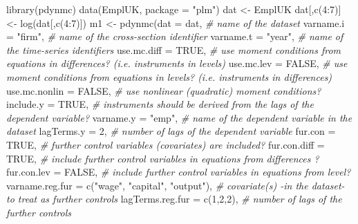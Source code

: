 \documentclass[
  12pt,
]{book}
\newenvironment{Shaded}{\begin{snugshade}}{\end{snugshade}}
\newcommand{\AttributeTok}[1]{\textcolor[rgb]{0.77,0.63,0.00}{#1}}
\newcommand{\CommentTok}[1]{\textcolor[rgb]{0.56,0.35,0.01}{\textit{#1}}}
\newcommand{\ConstantTok}[1]{\textcolor[rgb]{0.00,0.00,0.00}{#1}}
\newcommand{\DecValTok}[1]{\textcolor[rgb]{0.00,0.00,0.81}{#1}}
\newcommand{\FunctionTok}[1]{\textcolor[rgb]{0.00,0.00,0.00}{#1}}
\newcommand{\NormalTok}[1]{#1}
\newcommand{\OtherTok}[1]{\textcolor[rgb]{0.56,0.35,0.01}{#1}}
\newcommand{\SpecialCharTok}[1]{\textcolor[rgb]{0.00,0.00,0.00}{#1}}
\newcommand{\StringTok}[1]{\textcolor[rgb]{0.31,0.60,0.02}{#1}}
\theoremstyle{definition}
\theoremstyle{definition}
\theoremstyle{definition}
\theoremstyle{definition}
\theoremstyle{remark}
\begin{document}
\begin{Shaded}
\begin{Highlighting}[]
\FunctionTok{library}\NormalTok{(pdynmc)}
\FunctionTok{data}\NormalTok{(EmplUK, }\AttributeTok{package =} \StringTok{"plm"}\NormalTok{)}
\NormalTok{dat }\OtherTok{\textless{}{-}}\NormalTok{ EmplUK}
\NormalTok{dat[,}\FunctionTok{c}\NormalTok{(}\DecValTok{4}\SpecialCharTok{:}\DecValTok{7}\NormalTok{)]         }\OtherTok{\textless{}{-}} \FunctionTok{log}\NormalTok{(dat[,}\FunctionTok{c}\NormalTok{(}\DecValTok{4}\SpecialCharTok{:}\DecValTok{7}\NormalTok{)])}
\NormalTok{m1 }\OtherTok{\textless{}{-}} \FunctionTok{pdynmc}\NormalTok{(}\AttributeTok{dat =}\NormalTok{ dat, }\CommentTok{\# name of the dataset}
             \AttributeTok{varname.i =} \StringTok{"firm"}\NormalTok{, }\CommentTok{\# name of the cross{-}section identifier}
             \AttributeTok{varname.t =} \StringTok{"year"}\NormalTok{, }\CommentTok{\# name of the time{-}series identifiers}
             \AttributeTok{use.mc.diff =} \ConstantTok{TRUE}\NormalTok{, }\CommentTok{\# use moment conditions from equations in differences? (i.e. instruments in levels) }
             \AttributeTok{use.mc.lev =} \ConstantTok{FALSE}\NormalTok{, }\CommentTok{\# use moment conditions from equations in levels? (i.e. instruments in differences)}
             \AttributeTok{use.mc.nonlin =} \ConstantTok{FALSE}\NormalTok{, }\CommentTok{\# use nonlinear (quadratic) moment conditions?}
             \AttributeTok{include.y =} \ConstantTok{TRUE}\NormalTok{, }\CommentTok{\# instruments should be derived from the lags of the dependent variable?}
             \AttributeTok{varname.y =} \StringTok{"emp"}\NormalTok{, }\CommentTok{\# name of the dependent variable in the dataset}
             \AttributeTok{lagTerms.y =} \DecValTok{2}\NormalTok{, }\CommentTok{\# number of lags of the dependent variable}
             \AttributeTok{fur.con =} \ConstantTok{TRUE}\NormalTok{, }\CommentTok{\# further control variables (covariates) are included?}
             \AttributeTok{fur.con.diff =} \ConstantTok{TRUE}\NormalTok{, }\CommentTok{\# include further control variables in equations from differences ?}
             \AttributeTok{fur.con.lev =} \ConstantTok{FALSE}\NormalTok{, }\CommentTok{\# include further control variables in equations from level?}
             \AttributeTok{varname.reg.fur =} \FunctionTok{c}\NormalTok{(}\StringTok{"wage"}\NormalTok{, }\StringTok{"capital"}\NormalTok{, }\StringTok{"output"}\NormalTok{), }\CommentTok{\# covariate(s) {-}in the dataset{-} to treat as further controls}
             \AttributeTok{lagTerms.reg.fur =} \FunctionTok{c}\NormalTok{(}\DecValTok{1}\NormalTok{,}\DecValTok{2}\NormalTok{,}\DecValTok{2}\NormalTok{), }\CommentTok{\# number of lags of the further controls}

\end{Highlighting}
\end{Shaded}
\end{document}
